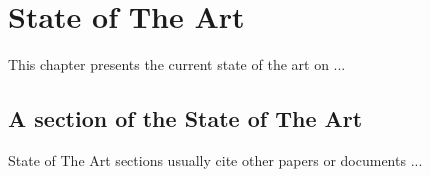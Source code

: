 

\chapter{State of The Art} 
\label{chap:stateOfTheArt}

This chapter presents the current state of the art on ... 

\section{A section of the State of The Art}
\label{sec:aSection}

State of The Art sections usually cite other papers or documents \cite{notSoShortIntro}... 






